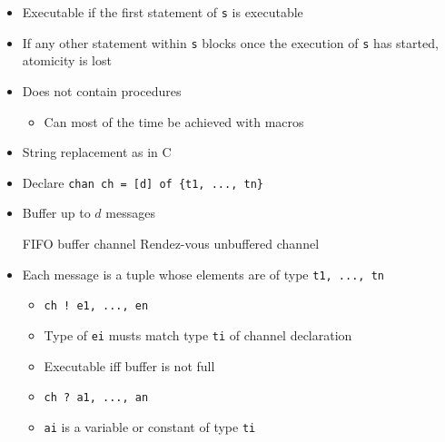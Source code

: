 \begin{itemize}
\begin{itemize}
\begin{itemize}
                    \item Executable if the first statement of \verb+s+ is executable
                    \item If any other statement within \verb+s+ blocks once the execution of \verb+s+ has started, atomicity is lost
                \end{itemize}
        \end{itemize}
        \begin{itemize}
            \item Does not contain procedures
                \begin{itemize}
                    \item Can most of the time be achieved with macros
                \end{itemize}
            \item String replacement as in C
        \end{itemize}
        \begin{itemize}
            \item Declare \verb+chan ch = [d] of {t1, ..., tn}+
            \item Buffer up to $d$ messages
                \begin{itemize}
                     FIFO buffer channel
                     Rendez-vous unbuffered channel
                \end{itemize}
            \item Each message is a tuple whose elements are of type \verb+t1, ..., tn+
                \begin{itemize}
                        \begin{itemize}
                            \item \verb+ch ! e1, ..., en+
                            \item Type of \verb+ei+ musts match type \verb+ti+ of channel declaration
                            \item Executable iff buffer is not full
                        \end{itemize}
                        \begin{itemize}
                            \item \verb+ch ? a1, ..., an+
                            \item \verb+ai+ is a variable or constant of type \verb+ti+

\end{itemize}
\end{itemize}
\end{itemize}
\end{itemize}

